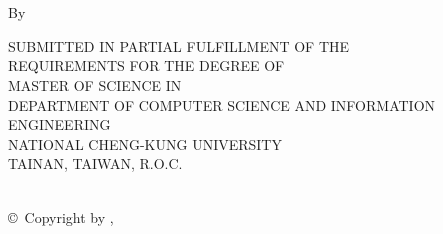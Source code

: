 \documentclass[12pt, a4paper]{report}
\begin{document}
\begin{titlepage}
\begin{center}
\ifx \advisorCnameB  \itsempty
\relax %
\else
\hspace{2.4em}%
\makebox[4.8em][s]{}%
\makebox[1em][c]{}%
\makebox[7.2em][l]{\Large\advisorCnameB}\\%
\fi
%
\ifx \advisorCnameC  \itsempty
\relax %
\else
\hspace{2.4em}%
\makebox[4.8em][s]{}%
\makebox[1em][c]{}%
\makebox[7.2em][l]{\Large\advisorCnameC}\\%
\fi
%
\vfill
{}%
%
\end{center}

\end{titlepage}


    \newpage
    \thispagestyle{empty}%


\ifx\mywatermark\undefined 
  \thispagestyle{empty}  %
\else
  \thispagestyle{EmptyWaterMarkPage} %
\fi
    \null\vskip0.5in
    \begin{center}
        \Large\uppercase\expandafter{\eTitle}
    \end{center}
    \vfill
    \begin{center}
        \large\rm By \\
        {\large\rm \myEname}
    \end{center}
    \vfill
    \begin{center}
        \footnotesize SUBMITTED IN PARTIAL FULFILLMENT OF THE \\
        REQUIREMENTS FOR THE DEGREE OF \\
        MASTER OF SCIENCE IN \\
        DEPARTMENT OF COMPUTER SCIENCE AND INFORMATION ENGINEERING \\
        NATIONAL CHENG-KUNG UNIVERSITY \\
        TAINAN, TAIWAN, R.O.C. \\
        {\eMonth \ \eYear}
    \end{center}
    \vskip0.75in
    \begin{center}
        \rm \copyright\ Copyright by {\myEname}, \eYear
    \end{center}
\end{document}
